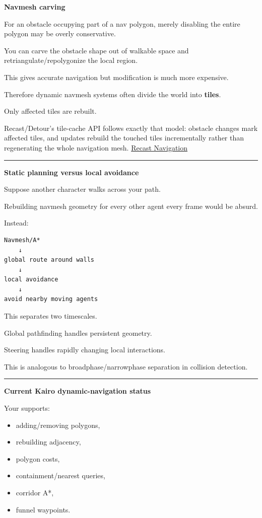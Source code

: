 \textbf{Navmesh carving}

For an obstacle occupying part of a nav polygon, merely disabling the entire polygon may be overly conservative.

You can carve the obstacle shape out of walkable space and retriangulate/repolygonize the local region.

This gives accurate navigation but modification is much more expensive.

Therefore dynamic navmesh systems often divide the world into \textbf{tiles}.

Only affected tiles are rebuilt.

Recast/Detour's tile-cache API follows exactly that model: obstacle changes mark affected tiles, and updates rebuild the touched tiles incrementally rather than regenerating the whole navigation mesh. \href{https://recastnav.com/classdtTileCache.html?utm_source=chatgpt.com}{Recast Navigation}

\begin{center}\rule{0.5\linewidth}{0.5pt}\end{center}

\textbf{Static planning versus local avoidance}

Suppose another character walks across your path.

Rebuilding navmesh geometry for every other agent every frame would be absurd.

Instead:

\begin{verbatim}
Navmesh/A*
    ↓
global route around walls
    ↓
local avoidance
    ↓
avoid nearby moving agents
\end{verbatim}

This separates two timescales.

Global pathfinding handles persistent geometry.

Steering handles rapidly changing local interactions.

This is analogous to broadphase/narrowphase separation in collision detection.

\begin{center}\rule{0.5\linewidth}{0.5pt}\end{center}

\textbf{Current Kairo dynamic-navigation status}

Your  supports:

\begin{itemize}
\tightlist
\item
  adding/removing polygons,
\item
  rebuilding adjacency,
\item
  polygon costs,
\item
  containment/nearest queries,
\item
  corridor A*,
\item
  funnel waypoints.
\end{itemize}

